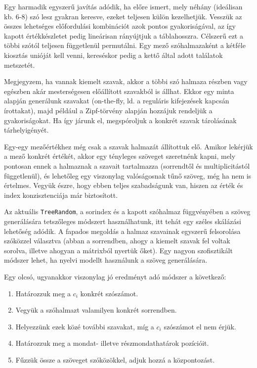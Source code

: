 \documentclass[
    parspace,
    noindent,
    nohyp,
]{elteiktdk}[2023/04/10]
\begin{document}
Egy harmadik egyszerű javítás adódik,
ha előre ismert, mely néhány (ideálisan kb. 6-8) szó lesz gyakran keresve,
ezeket teljesen külön kezelhetjük.
Vesszük az összes lehetséges előfordulási kombinációt azok pontos gyakoriságával,
az így kapott értékkészletet pedig lineárisan rányújtjuk a táblahosszra.
Célszerű ezt a többi szótól teljesen függetlenül permutálni.
Egy mező szóhalmazaként a kétféle kiosztás unióját kell venni,
kereséskor pedig a kettő által adott találatok metszetét.

Megjegyzem, ha vannak kiemelt szavak, akkor a többi szó halmaza részben vagy egészben
akár mesterségesen előállított szavakból is állhat.
Ekkor egy minta alapján generálunk szavakat
(on-the-fly, ld. a reguláris kifejezések kapcsán írottakat),
majd például a Zipf-törvény alapján hozzájuk rendeljük a gyakoriságokat.
Ha így járunk el, megspóroljuk a konkrét szavak tárolásának tárhelyigényét.

Egy-egy mezőértékhez még csak a szavak halmazát állítottuk elő.
Amikor lekérjük a mező konkrét értékét, akkor egy tényleges szöveget szeretnénk kapni,
mely pontosan ennek a halmaznak a szavait tartalmazza (sorrendtől és multiplicitástól függetlenül),
és lehetőleg egy viszonylag valóságosnak tűnő szöveg, még ha nem is értelmes.
Vegyük észre, hogy ebben teljes szabadságunk van, hiszen az érték és index konzisztenciája már biztosított.

Az aktuális \texttt{TreeRandom}, a sorindex és a kapott szóhalmaz függvényében
a szöveg generálására tetszőleges módszert használhatunk,
itt tehát egy széles skálázási lehetőség adódik.
A fapados megoldás a halmaz szavainak egyszerű felsorolása szóközzel választva
(abban a sorrendben, ahogy a kiemelt szavak fel voltak sorolva, illetve ahogyan a mátrixból nyertük őket).
Egy nagyon szofisztikált módszer lehet, ha nyelvi modellt használunk a szöveg generálására.

Egy olcsó, ugyanakkor viszonylag jó eredményt adó módszer a következő:

\begin{enumerate}
    \item Határozzuk meg a $c_i$ konkrét szószámot.
    \item Vegyük a szóhalmazt valamilyen konkrét sorrendben.
    \item Helyezzünk ezek közé további szavakat, míg a $c_i$ szószámot el nem érjük.
    \item Határozzuk meg a mondat- illetve részmondathatárok pozícióit.
    \item Fűzzük össze a szöveget szóközökkel, adjuk hozzá a központozást.
\end{enumerate}
\end{document}
